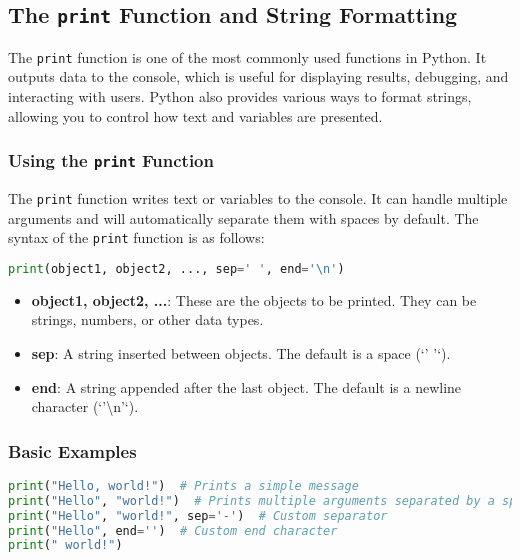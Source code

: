 \subsection{The \texttt{print} Function and String Formatting}

The \texttt{print} function is one of the most commonly used functions in Python. It outputs data to the console, which is useful for displaying results, debugging, and interacting with users. Python also provides various ways to format strings, allowing you to control how text and variables are presented.

\subsubsection{Using the \texttt{print} Function}

The \texttt{print} function writes text or variables to the console. It can handle multiple arguments and will automatically separate them with spaces by default. The syntax of the \texttt{print} function is as follows:

\begin{lstlisting}[language=Python, caption=Basic Usage of \texttt{print}]
print(object1, object2, ..., sep=' ', end='\n')
\end{lstlisting}

\begin{itemize}
    \item \textbf{object1, object2, ...}: These are the objects to be printed. They can be strings, numbers, or other data types.
    \item \textbf{sep}: A string inserted between objects. The default is a space (`' '`).
    \item \textbf{end}: A string appended after the last object. The default is a newline character (`'\textbackslash n'`).
\end{itemize}

\subsubsection{Basic Examples}

\begin{lstlisting}[language=Python, caption=Basic \texttt{print} Function Example]
print("Hello, world!")  # Prints a simple message
print("Hello", "world!")  # Prints multiple arguments separated by a space
print("Hello", "world!", sep='-')  # Custom separator
print("Hello", end='')  # Custom end character
print(" world!")
\end{lstlisting}

